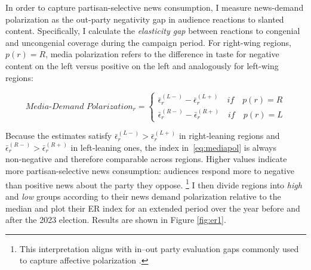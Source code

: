 \documentclass[12pt]{article}
\begin{document}
In order to capture partisan-selective news consumption, I measure  news-demand polarization as the out-party negativity gap in audience reactions to slanted content. Specifically, I calculate the \emph{elasticity gap} between reactions to congenial and uncongenial coverage during the campaign period. For right-wing regions, $p(r)=R$, media polarization refers to the difference in taste for negative content on the left versus positive on the left and analogously for left-wing regions:


\begin{equation}
	\textit{Media-Demand Polarization}_r  =	\begin{cases}
		\bar{\epsilon}_r^{(L-)}- \bar{\epsilon}_r^{(L+)} \quad if \quad p(r)=R\\
		\bar{\epsilon}_r^{(R-)}- \bar{\epsilon}_r^{(R+)} \quad if \quad p(r)=L
	\end{cases}
	\label{eq:mediapol}
\end{equation}



Because the estimates satisfy
\(\bar{\epsilon}_r^{(L-)}>\bar{\epsilon}_r^{(L+)}\) in right‑leaning regions and
\(\bar{\epsilon}_r^{(R-)}>\bar{\epsilon}_r^{(R+)}\) in left‑leaning ones,
the index in~\eqref{eq:mediapol} is always non‑negative and therefore comparable across regions. Higher values indicate more partisan-selective news consumption: audiences 	 respond more to negative than positive news about the party they oppose. \footnote{This interpretation aligns with in–out party evaluation gaps commonly used to capture affective polarization \citep{IyengarLelkesLevendusky2019Origins}.} I then divide regions into \textit{high} and \textit{low} groups according to their news demand polarization  relative to the median and plot their ER index for an extended period over the year before and after the 2023 election.  Results are shown in Figure \ref{fig:er1}.
\end{document}
